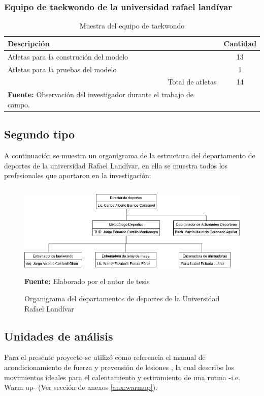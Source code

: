 \subsubsection{Equipo de taekwondo de la universidad rafael land\'ivar}\label{sj:1t:tae}
\begin{table}[H]
\begin{center}
\caption{Muestra del equipo de taekwondo}
\label{tab:MuestraTaekwondo}
\begin{tabular}{lc}
\hline
\multicolumn{1}{|l|}{\textbf{Descripci\'on}} & \multicolumn{1}{l|}{\textbf{Cantidad}} \\ \hline
\multicolumn{1}{|l|}{Atletas para la construci\'on del modelo} & \multicolumn{1}{c|}{13} \\ \hline
\multicolumn{1}{|l|}{Atletas para la pruebas del modelo} & \multicolumn{1}{c|}{1} \\ \hline
\multicolumn{1}{|r|}{Total de atletas} & \multicolumn{1}{c|}{14} \\ \hline
\textbf{Fuente:} Observaci\'on del investigador durante el trabajo de campo.
\end{tabular}
\end{center}
\end{table}
\subsection{Segundo tipo} \label{sj:2t}
A continuaci\'on se muestra un organigrama de la estructura del departamento de deportes de la universidad Rafael Land\'ivar, en ella se muestra todos los profesionales que aportaron en la investigaci\'on:
\begin{figure}[H]
	\caption{Organigrama del departamentos de deportes de la Universidad Rafael Land\'ivar}
	\label{fig:orgDeportes}
	\centering
	\includegraphics[width=450px,height=170px]{graphics/orgDeportes.png} \\
	\textbf{Fuente:} Elaborado por el autor de tesis
\end{figure}
\subsection{Unidades de an\'alisis} \label{sj:ua}
Para el presente proyecto se utiliz\'o como referencia el manual de acondicionamiento de fuerza y prevensi\'on de lesiones  \cite{arbour2006strength}, la cual describe los movimientos ideales para el calentamiento  y estiramiento de una rutina -i.e. Warm up- (Ver secci\'on de anexos \ref{anx:warmup}).